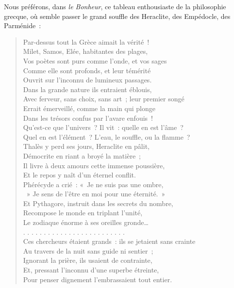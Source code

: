 \documentclass[french,twoside]{book} %
\begin{document}
\noindent Nous préférons, dans \emph{le Bonheur}, ce tableau enthousiaste de la philosophie grecque, où semble passer le grand souffle des Heraclite, des Empédocle, des Parménide :\par


\begin{verse}
Par-dessus tout la Grèce aimait la vérité !\\
Milet, Samos, Elée, habitantes des plages,\\
Vos poètes sont purs comme l’onde, et vos sages\\
Comme elle sont profonds, et leur témérité\\
Ouvrit sur l’inconnu de lumineux passages.\\
Dans la grande nature ils entraient éblouis,\\
Avec ferveur, sans choix, sans art ; leur premier songé\\
Errait émerveillé, comme la main qui plonge\\
Dans les trésors confus par l’avare enfouis !\\
Qu’est-ce que l’univers ? Il vit : quelle en est l’âme ?\\
Quel en est l’élément ? L’eau, le souffle, ou la flamme ?\\
Thalès y perd ses jours, Heraclite en pâlit,\\
Démocrite en riant a broyé la matière ;\\
Il livre à deux amours cette immense poussière,\\
Et le repos y naît d’un éternel conflit.\\
Phérécyde a crié : « Je ne suis pas une ombre, \\
 » Je sens de l’être en moi pour une éternité. »\\
Et Pythagore, instruit dans les secrets du nombre,\\
Recompose le monde en triplant l’unité,\\
Le zodiaque énorme à ses oreilles gronde…\\
. . . . . . . . . . . . . . . . . . . . . . . . .\\
Ces chercheurs étaient grands : ils se jetaient sans crainte\\
Au travers de la nuit sans guide ni sentier ;\\
Ignorant la prière, ils usaient de contrainte,\\
Et, pressant l’inconnu d’une superbe étreinte,\\
Pour penser dignement l’embrassaient tout entier.\\

\end{verse}
\end{document}
